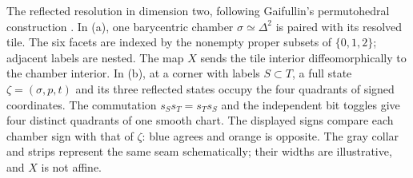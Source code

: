 \begin{minipage}{\textwidth}
\begin{minipage}[t]{0.43\textwidth}
\end{minipage}
\caption{The reflected resolution in dimension two, following
Gaifullin's permutohedral construction \cite{Gaifullin2008}. In (a), one
barycentric chamber \(\sigma\simeq\Delta^2\) is paired with its resolved
tile. The six facets are indexed by the nonempty proper subsets of
\(\{0,1,2\}\); adjacent labels are nested. The map \(X\) sends the tile
interior diffeomorphically to the chamber interior. In (b), at a corner
with labels \(S\subset T\), a full state \(\zeta=(\sigma,p,t)\) and its three reflected states occupy the four
quadrants of signed coordinates. The commutation
\(s_Ss_T=s_Ts_S\) and the independent bit toggles give four distinct
quadrants of one smooth chart. The displayed signs compare each chamber
sign with that of \(\zeta\): blue agrees and orange is opposite. The gray collar
and strips represent the same seam schematically; their widths are
illustrative, and \(X\) is not affine.}
\label{fig:resolution}
\end{minipage}
\par\medskip
